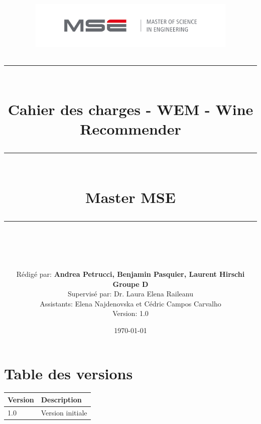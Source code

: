 \documentclass[11pt,a4paper]{report}
\newcommand{\horrule}[1]{\rule{\linewidth}{#1}} 	%
\begin{document}



\title{
        \includegraphics[width=10cm]{rsc/mse_logo.png} \\
        
        \horrule{2pt} \\[0.4cm]
        \huge{\textbf{Cahier des charges - WEM - Wine Recommender}}\\
        \horrule{1pt} \\[0.5cm]
        Master MSE
        \horrule{2pt} \\[0.5cm]
        }
\author{Rédigé par: \textbf{Andrea Petrucci, Benjamin Pasquier, Laurent Hirschi} \vspace{2mm} \\
                    \textbf{Groupe D} \vspace{5mm} \\
        Supervisé par: Dr. Laura Elena Raileanu \vspace{2mm} \\
        Assistants: Elena Najdenovska et Cédric Campos Carvalho \vspace{5mm} \\
        Version: 1.0}
\date{\today}
\maketitle


\chapter*{Table des versions}
        \begin{table}[H]
        \begin{tabular}{|p{2cm}|p{14.1cm}|}
        \hline
        \textbf{Version} & \textbf{Description} \\ \hline
        1.0 & Version initiale \\  \hline  
        \end{tabular}
\end{table}
\end{document}
